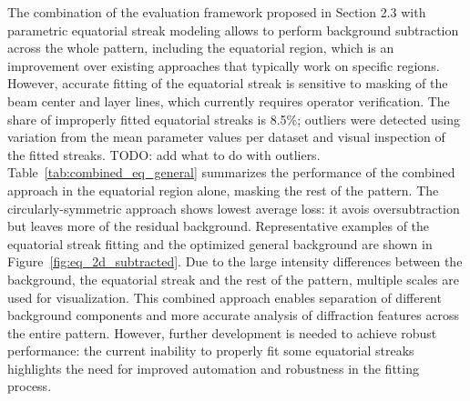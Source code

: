 \documentclass[iucr]{iucrjournals}
\begin{document}
The combination of the evaluation framework proposed in Section 2.3 with parametric equatorial streak modeling allows to perform background subtraction across the whole pattern, including the equatorial region, which is an improvement over existing approaches that typically work on specific regions. However, accurate fitting of the equatorial streak is sensitive to masking of the beam center and layer lines, which currently requires operator verification. The share of improperly fitted equatorial streaks is 8.5\%; outliers were detected using variation from the mean parameter values per dataset and visual inspection of the fitted streaks. {\color{blue} TODO: add what to do with outliers}. Table~\ref{tab:combined_eq_general} summarizes the performance of the combined approach in the equatorial region alone, masking the rest of the pattern. The circularly-symmetric approach shows lowest average loss: it avois oversubtraction but leaves more of the residual background. Representative examples of the equatorial streak fitting and the optimized general background are shown in Figure~\ref{fig:eq_2d_subtracted}. Due to the large intensity differences between the background, the equatorial streak and the rest of the pattern, multiple scales are used for visualization. This combined approach enables separation of different background components and more accurate analysis of diffraction features across the entire pattern. However, further development is needed to achieve robust performance: the current inability to properly fit some equatorial streaks highlights the need for improved automation and robustness in the fitting process.
\end{document}

